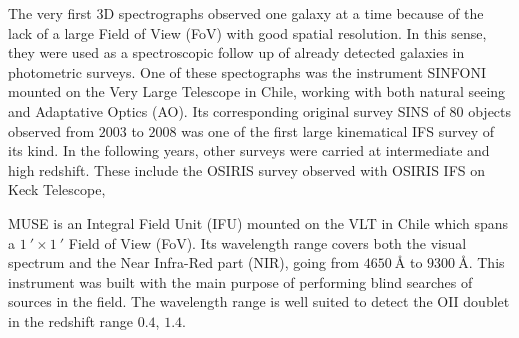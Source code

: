 The very first 3D spectrographs observed one galaxy at a time because of the lack of a large Field of View (FoV) with good spatial resolution. In this sense, they were used as a spectroscopic follow up of already detected galaxies in photometric surveys. One of these spectographs was the instrument SINFONI  mounted on the Very Large Telescope in Chile, working with both natural seeing and Adaptative Optics (AO). Its corresponding original survey SINS  of $80$ objects observed from $2003$ to $2008$ was one of the first large kinematical IFS survey of its kind. In the following years, other surveys were carried at intermediate and high redshift. These include the OSIRIS survey  observed with OSIRIS IFS on Keck Telescope, 



MUSE is an Integral Field Unit (IFU) mounted on the VLT in Chile which spans a $\SI{1}{\arcmin} \times \SI{1}{\arcmin}$ Field of View (FoV). Its wavelength range covers both the visual spectrum and the Near Infra-Red part (NIR), going from $\SI{4650}{\angstrom}$ to $\SI{9300}{\angstrom}$. This instrument was built with the main purpose of performing blind searches of sources in the field. The wavelength range is well suited to detect the OII doublet in the redshift range $0.4$, $1.4$.